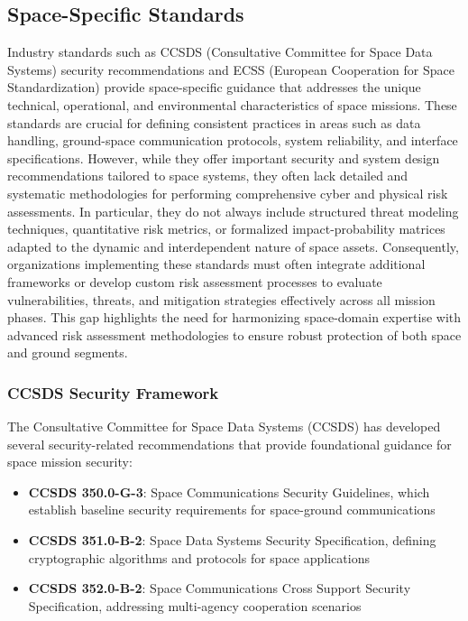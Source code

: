 \documentclass[binding=0.6cm]{sapthesis}
\begin{document}
\subsection{Space-Specific Standards}

Industry standards such as CCSDS (Consultative Committee for Space Data Systems) security recommendations and ECSS (European Cooperation for Space Standardization) provide space-specific guidance that addresses the unique technical, operational, and environmental characteristics of space missions. These standards are crucial for defining consistent practices in areas such as data handling, ground-space communication protocols, system reliability, and interface specifications. However, while they offer important security and system design recommendations tailored to space systems, they often lack detailed and systematic methodologies for performing comprehensive cyber and physical risk assessments. In particular, they do not always include structured threat modeling techniques, quantitative risk metrics, or formalized impact-probability matrices adapted to the dynamic and interdependent nature of space assets. Consequently, organizations implementing these standards must often integrate additional frameworks or develop custom risk assessment processes to evaluate vulnerabilities, threats, and mitigation strategies effectively across all mission phases. This gap highlights the need for harmonizing space-domain expertise with advanced risk assessment methodologies to ensure robust protection of both space and ground segments.

\subsubsection{CCSDS Security Framework}

The Consultative Committee for Space Data Systems (CCSDS) has developed several security-related recommendations that provide foundational guidance for space mission security:

\begin{itemize}
    \item \textbf{CCSDS 350.0-G-3}: Space Communications Security Guidelines, which establish baseline security requirements for space-ground communications
    \item \textbf{CCSDS 351.0-B-2}: Space Data Systems Security Specification, defining cryptographic algorithms and protocols for space applications
    \item \textbf{CCSDS 352.0-B-2}: Space Communications Cross Support Security Specification, addressing multi-agency cooperation scenarios
\end{itemize}
\end{document}
